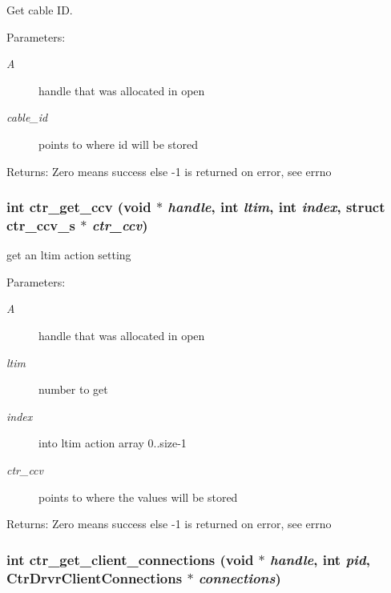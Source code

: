 Get cable ID. 

\begin{Desc}
\item[Parameters:]
\begin{description}
\item[{\em A}]handle that was allocated in open \item[{\em cable\_\-id}]points to where id will be stored \end{description}
\end{Desc}
\begin{Desc}
\item[Returns:]Zero means success else -1 is returned on error, see errno \end{Desc}
\subsubsection{\setlength{\rightskip}{0pt plus 5cm}int ctr\_\-get\_\-ccv (void $\ast$ {\em handle}, int {\em ltim}, int {\em index}, struct \bf{ctr\_\-ccv\_\-s} $\ast$ {\em ctr\_\-ccv})}\label{libctr_8doxygen_2b14397191d592972c6216ae2de44d68}


get an ltim action setting 

\begin{Desc}
\item[Parameters:]
\begin{description}
\item[{\em A}]handle that was allocated in open \item[{\em ltim}]number to get \item[{\em index}]into ltim action array 0..size-1 \item[{\em ctr\_\-ccv}]points to where the values will be stored \end{description}
\end{Desc}
\begin{Desc}
\item[Returns:]Zero means success else -1 is returned on error, see errno \end{Desc}
\subsubsection{\setlength{\rightskip}{0pt plus 5cm}int ctr\_\-get\_\-client\_\-connections (void $\ast$ {\em handle}, int {\em pid}, Ctr\-Drvr\-Client\-Connections $\ast$ {\em connections})}\label{libctr_8doxygen_0034170a230c6c84919c3e341dd7d652}


